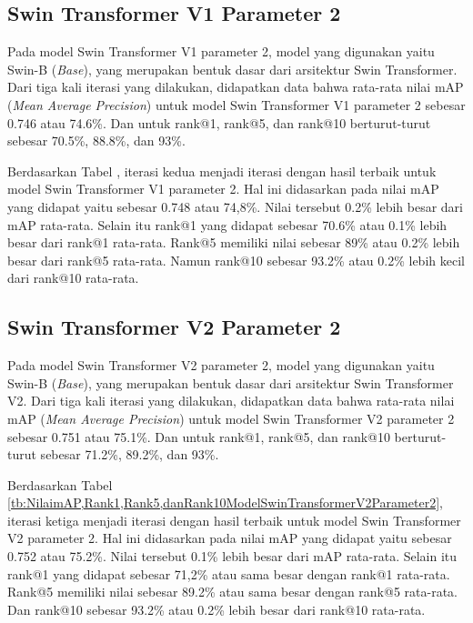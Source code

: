 \subsection{Swin Transformer V1 Parameter 2}

Pada model Swin Transformer V1 parameter 2, model yang digunakan yaitu Swin-B (\emph{Base}), yang merupakan bentuk 
dasar dari arsitektur Swin Transformer. Dari tiga kali iterasi yang dilakukan, didapatkan data bahwa rata-rata nilai 
mAP (\emph{Mean Average Precision}) untuk model Swin Transformer V1 parameter 2 sebesar 0.746 atau 74.6\%. Dan untuk 
rank@1, rank@5, dan rank@10 berturut-turut sebesar 70.5\%, 88.8\%, dan 93\%. 

Berdasarkan Tabel , iterasi kedua menjadi 
iterasi dengan hasil terbaik untuk model Swin Transformer V1 parameter 2. 
Hal ini didasarkan pada nilai mAP yang didapat yaitu sebesar 0.748 atau 74,8\%. Nilai tersebut 0.2\% lebih besar dari 
mAP rata-rata. Selain itu rank@1 yang didapat sebesar 70.6\% atau 0.1\% lebih besar dari rank@1 rata-rata. Rank@5 
memiliki nilai sebesar 89\% atau 0.2\% lebih besar dari rank@5 rata-rata. Namun rank@10 sebesar 93.2\% atau 0.2\% 
lebih kecil dari rank@10 rata-rata.

\subsection{Swin Transformer V2 Parameter 2}

Pada model Swin Transformer V2 parameter 2, model yang digunakan yaitu Swin-B (\emph{Base}), yang merupakan bentuk 
dasar dari arsitektur Swin Transformer V2. Dari tiga kali iterasi yang dilakukan, didapatkan data bahwa rata-rata nilai 
mAP (\emph{Mean Average Precision}) untuk model Swin Transformer V2 parameter 2 sebesar 0.751 atau 75.1\%. Dan untuk 
rank@1, rank@5, dan rank@10 berturut-turut sebesar 71.2\%, 89.2\%, dan 93\%. 

Berdasarkan Tabel \ref{tb:NilaimAP,Rank1,Rank5,danRank10ModelSwinTransformerV2Parameter2}, iterasi ketiga menjadi 
iterasi dengan hasil terbaik untuk model Swin Transformer V2 parameter 2. 
Hal ini didasarkan pada nilai mAP yang didapat yaitu sebesar 0.752 atau 75.2\%. Nilai tersebut 0.1\% lebih besar dari 
mAP rata-rata. Selain itu rank@1 yang didapat sebesar 71,2\% atau sama besar dengan rank@1 rata-rata. Rank@5 memiliki 
nilai sebesar 89.2\% atau sama besar dengan rank@5 rata-rata. Dan rank@10 sebesar 93.2\% atau 0.2\% 
lebih besar dari rank@10 rata-rata.

